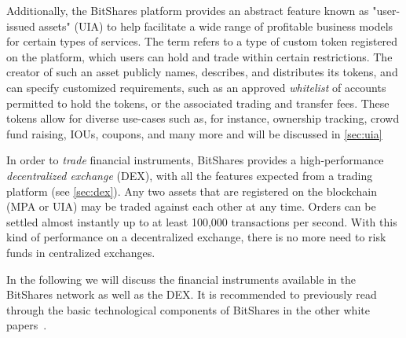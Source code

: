 Additionally, the BitShares platform provides an abstract feature known as
"user-issued assets" (UIA) to help facilitate a wide range of profitable
business models for certain types of services. The term refers to a type of
custom token registered on the platform, which users can hold and trade within
certain restrictions. The creator of such an asset publicly names, describes,
and distributes its tokens, and can specify customized requirements, such as an
approved \emph{whitelist} of accounts permitted to hold the tokens, or the
associated trading and transfer fees. These tokens allow for diverse use-cases
such as, for instance, ownership tracking, crowd fund raising, IOUs, coupons,
and many more and will be discussed in \cref{sec:uia}

In order to \emph{trade} financial instruments, BitShares provides a
high-performance \emph{decentralized exchange} (DEX), with all the features
expected from a trading platform (see \cref{sec:dex}). Any two assets that are
registered on the blockchain (MPA or UIA) may be traded against each other at
any time. Orders can be settled almost instantly up to at least 100,000
transactions per second.  With this kind of performance on a decentralized
exchange, there is no more need to risk funds in centralized exchanges.


In the following we will discuss the financial instruments available in the
BitShares network as well as the DEX. It is recommended to previously read
through the basic technological components of BitShares in the other white
papers~\cite{bts:general,bts:growth,bts:structure}.
